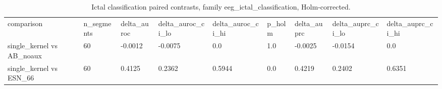 \begin{table}
\caption{Ictal classification paired contrasts, family eeg\_ictal\_classification, Holm-corrected.}
\label{tab:ictal_classification_contrasts}
\begin{ruledtabular}
\begin{tabular}{lllllllll}
comparison & n_segments & delta_auroc & delta_auroc_ci_lo & delta_auroc_ci_hi & p_holm & delta_auprc & delta_auprc_ci_lo & delta_auprc_ci_hi \\
single_kernel vs AB_noaux & 60 & -0.0012 & -0.0075 & 0.0 & 1.0 & -0.0025 & -0.0154 & 0.0 \\
single_kernel vs ESN_66 & 60 & 0.4125 & 0.2362 & 0.5944 & 0.0 & 0.4219 & 0.2402 & 0.6351 \\
\end{tabular}
\end{ruledtabular}
\end{table}
